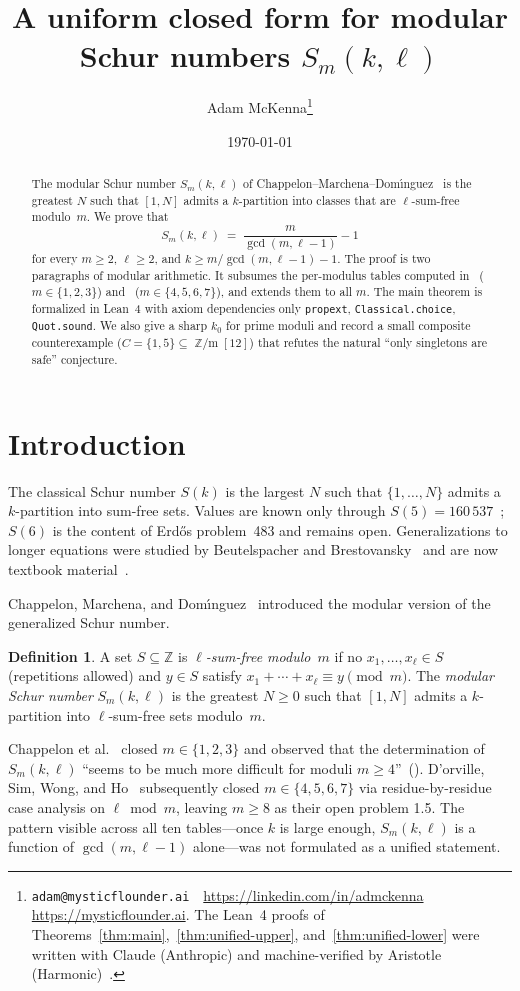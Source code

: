 \documentclass[11pt]{amsart}
\title{A uniform closed form for modular Schur numbers $S_m(k,\ell)$}
\author{Adam McKenna\thanks{\texttt{adam@mysticflounder.ai} \,\textperiodcentered\, \url{https://linkedin.com/in/admckenna} \,\textperiodcentered\, \url{https://mysticflounder.ai}. The Lean~4 proofs of Theorems~\ref{thm:main},~\ref{thm:unified-upper}, and~\ref{thm:unified-lower} were written with Claude (Anthropic) and machine-verified by Aristotle (Harmonic)~\cite{aristotle}.}}
\date{\today}
\theoremstyle{plain}
\theoremstyle{definition}
\newtheorem{definition}[theorem]{Definition}
\DeclareMathOperator{\Zm}{\mathbb{Z}/m}
\begin{document}
\maketitle

\begin{abstract}
The modular Schur number $S_m(k,\ell)$ of Chappelon--Marchena--Dom\'\i nguez~\cite{CMD2013} is the greatest $N$ such that $[1,N]$ admits a $k$-partition into classes that are $\ell$-sum-free modulo~$m$. We prove that
\[
S_m(k,\ell) \;=\; \frac{m}{\gcd(m,\ell-1)} - 1
\]
for every $m\ge 2$, $\ell\ge 2$, and $k\ge m/\gcd(m,\ell-1) - 1$. The proof is two paragraphs of modular arithmetic. It subsumes the per-modulus tables computed in~\cite{CMD2013} ($m\in\{1,2,3\}$) and~\cite{DSWH2025} ($m\in\{4,5,6,7\}$), and extends them to all $m$. The main theorem is formalized in Lean~4 with axiom dependencies only \texttt{propext}, \texttt{Classical.choice}, \texttt{Quot.sound}. We also give a sharp $k_0$ for prime moduli and record a small composite counterexample ($C=\{1,5\}\subseteq\Zm[12]$) that refutes the natural ``only singletons are safe'' conjecture.
\end{abstract}

\section{Introduction}

The classical Schur number $S(k)$ is the largest $N$ such that $\{1,\ldots,N\}$ admits a $k$-partition into sum-free sets. Values are known only through $S(5) = 160\,537$~\cite{Heule2017}; $S(6)$ is the content of Erd\H{o}s problem~483 and remains open. Generalizations to longer equations were studied by Beutelspacher and Brestovansky~\cite{BB1982} and are now textbook material~\cite{LR2014}.

Chappelon, Marchena, and Dom\'\i nguez~\cite{CMD2013} introduced the modular version of the generalized Schur number.

\begin{definition}
A set $S\subseteq\mathbb{Z}$ is \emph{$\ell$-sum-free modulo~$m$} if no $x_1,\ldots,x_\ell\in S$ (repetitions allowed) and $y\in S$ satisfy $x_1+\cdots+x_\ell \equiv y\pmod m$. The \emph{modular Schur number} $S_m(k,\ell)$ is the greatest $N\ge 0$ such that $[1,N]$ admits a $k$-partition into $\ell$-sum-free sets modulo~$m$.
\end{definition}

Chappelon et al.~\cite{CMD2013} closed $m\in\{1,2,3\}$ and observed that the determination of $S_m(k,\ell)$ ``seems to be much more difficult for moduli $m\ge 4$''~(\cite[\S6]{CMD2013}). D'orville, Sim, Wong, and Ho~\cite{DSWH2025} subsequently closed $m\in\{4,5,6,7\}$ via residue-by-residue case analysis on $\ell\bmod m$, leaving $m\ge 8$ as their open problem 1.5. The pattern visible across all ten tables---once $k$ is large enough, $S_m(k,\ell)$ is a function of $\gcd(m,\ell-1)$ alone---was not formulated as a unified statement.
\end{document}
